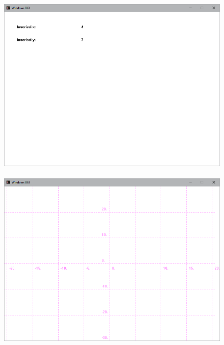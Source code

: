 \documentclass[12pt]{book}
\begin{document}
		
		\begin{figure}[h]
			\includegraphics[scale=0.5]{tracciapixelterminale1}
				\\ \\
			\includegraphics[scale=0.5]{tracciapixelterminale2}
		\end{figure}
		\clearpage
		\newpage
		
		\newpage
		
\end{document}
